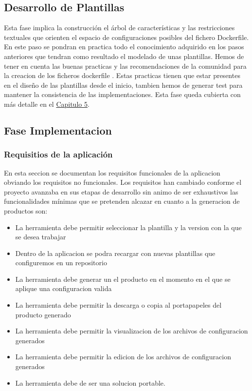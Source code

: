 \documentclass[12pt, a4paper, twoside]{article}
\begin{document}
\subsection{Desarrollo de Plantillas}
Esta fase implica la construcción el árbol de características y las restricciones textuales que orienten el espacio de 
configuraciones posibles del fichero Dockerfile. En este paso se pondran en practica todo el conocimiento adquirido en los pasos anteriores que 
tendran como resultado el modelado de unas plantillas. Hemos de tener en cuenta las buenas practicas y las recomendaciones de la comunidad para la creacion de los ficheros dockerfile \cite{dockerfile_concepts}. 
Estas practicas tienen que estar presentes en el diseño de las plantillas desde el inicio, tambien hemos de generar test para mantener la consistencia de las implementaciones. 
Esta fase queda cubierta con más detalle en el \hyperref[sec:Modelado de las plantillas]{Capitulo 5}.


\subsection{Fase Implementacion}
\subsubsection{Requisitios de la aplicación }
En esta seccion se documentan los requisitos funcionales de la aplicacion obviando los requisitos no funcionales. Los requisitos han cambiado conforme el proyecto avanzaba en sus etapas de desarrollo
sin animo de ser exhaustivos las funcionalidades mínimas que se pretenden alcazar en cuanto a la generacion de productos son:
\begin{itemize}
	\item La herramienta debe permitir seleccionar la plantilla y la version con la que se desea trabajar 
	\item Dentro de la aplicacion se podra recargar con nuevas plantillas que configuremos en un repositorio
	\item La herramienta debe generar un el producto en el momento en el que se aplique una configuracion valida 
	\item La herramienta debe permitir la descarga o copia al portapapeles del producto generado
	\item La herramienta debe permitir la visualizacion de los archivos de configuracion generados
	\item La herramienta debe permitir la edicion de los archivos de configuracion generados
	\item La herramienta debe de ser una solucion portable.
\end{itemize}
\end{document}
